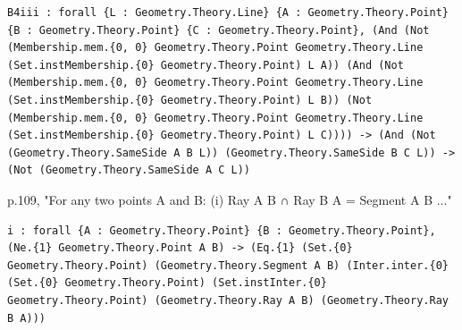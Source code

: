 \begin{theorem}
  \label{Geometry.Ch3.Prop.B4iii}
  \leanok
\begin{verbatim}B4iii : forall {L : Geometry.Theory.Line} {A : Geometry.Theory.Point} {B : Geometry.Theory.Point} {C : Geometry.Theory.Point}, (And (Not (Membership.mem.{0, 0} Geometry.Theory.Point Geometry.Theory.Line (Set.instMembership.{0} Geometry.Theory.Point) L A)) (And (Not (Membership.mem.{0, 0} Geometry.Theory.Point Geometry.Theory.Line (Set.instMembership.{0} Geometry.Theory.Point) L B)) (Not (Membership.mem.{0, 0} Geometry.Theory.Point Geometry.Theory.Line (Set.instMembership.{0} Geometry.Theory.Point) L C)))) -> (And (Not (Geometry.Theory.SameSide A B L)) (Geometry.Theory.SameSide B C L)) -> (Not (Geometry.Theory.SameSide A C L))\end{verbatim}
\end{theorem}


\begin{theorem}
  \label{Geometry.Ch3.Prop.P1.i}
  \leanok
  p.109, "For any two points A and B: (i) Ray A B ∩ Ray B A = Segment A B ..." 
\begin{verbatim}i : forall {A : Geometry.Theory.Point} {B : Geometry.Theory.Point}, (Ne.{1} Geometry.Theory.Point A B) -> (Eq.{1} (Set.{0} Geometry.Theory.Point) (Geometry.Theory.Segment A B) (Inter.inter.{0} (Set.{0} Geometry.Theory.Point) (Set.instInter.{0} Geometry.Theory.Point) (Geometry.Theory.Ray A B) (Geometry.Theory.Ray B A)))\end{verbatim}
\end{theorem}


